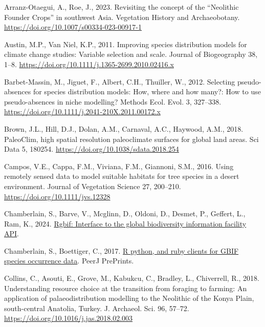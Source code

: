 \documentclass[
  number,
  review]{elsarticle}
\newlength{\cslhangindent}
\newenvironment{CSLReferences}[2] %
 {\begin{list}{}{%
  \setlength{\itemindent}{0pt}
  \setlength{\leftmargin}{0pt}
  \setlength{\parsep}{0pt}
  \ifodd #1
   \setlength{\leftmargin}{\cslhangindent}
   \setlength{\itemindent}{-1\cslhangindent}
  \fi
  \setlength{\itemsep}{#2\baselineskip}}}
 {\end{list}}
\begin{document}
\label{refs}
\begin{CSLReferences}{1}{0}
Arranz-Otaegui, A., Roe, J., 2023. Revisiting the concept of the
{``{Neolithic Founder Crops}''} in southwest {Asia}. Vegetation History
and Archaeobotany. \url{https://doi.org/10.1007/s00334-023-00917-1}

Austin, M.P., Van Niel, K.P., 2011. Improving species distribution
models for climate change studies: Variable selection and scale. Journal
of Biogeography 38, 1--8.
\url{https://doi.org/10.1111/j.1365-2699.2010.02416.x}

Barbet-Massin, M., Jiguet, F., Albert, C.H., Thuiller, W., 2012.
Selecting pseudo-absences for species distribution models: How, where
and how many?: {How} to use pseudo-absences in niche modelling? Methods
Ecol. Evol. 3, 327--338.
\url{https://doi.org/10.1111/j.2041-210X.2011.00172.x}

Brown, J.L., Hill, D.J., Dolan, A.M., Carnaval, A.C., Haywood, A.M.,
2018. {PaleoClim}, high spatial resolution paleoclimate surfaces for
global land areas. Sci Data 5, 180254.
\url{https://doi.org/10.1038/sdata.2018.254}

Campos, V.E., Cappa, F.M., Viviana, F.M., Giannoni, S.M., 2016. Using
remotely sensed data to model suitable habitats for tree species in a
desert environment. Journal of Vegetation Science 27, 200--210.
\url{https://doi.org/10.1111/jvs.12328}

Chamberlain, S., Barve, V., Mcglinn, D., Oldoni, D., Desmet, P.,
Geffert, L., Ram, K., 2024.
\href{https://CRAN.R-project.org/package=rgbif}{Rgbif: Interface to the
global biodiversity information facility API}.

Chamberlain, S., Boettiger, C., 2017.
\href{https://doi.org/10.7287/peerj.preprints.3304v1}{R python, and ruby
clients for GBIF species occurrence data}. PeerJ PrePrints.

Collins, C., Asouti, E., Grove, M., Kabukcu, C., Bradley, L.,
Chiverrell, R., 2018. Understanding resource choice at the transition
from foraging to farming: {An} application of palaeodistribution
modelling to the {Neolithic} of the {Konya Plain}, south-central
{Anatolia}, {Turkey}. J. Archaeol. Sci. 96, 57--72.
\url{https://doi.org/10.1016/j.jas.2018.02.003}


\end{CSLReferences}
\end{document}
